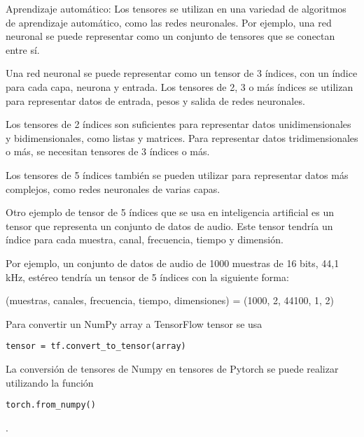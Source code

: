\documentclass[10pd,hyperref={colorlinks=true}]{beamer}
\begin{document}

\begin{frame}{}

 \vfill

Aprendizaje automático: Los tensores se utilizan en una 
variedad de algoritmos de aprendizaje automático, como las 
redes neuronales. Por ejemplo, una red neuronal se puede 
representar como un conjunto de tensores que se conectan entre 
sí.

Una red neuronal se puede representar como un tensor de 3 índices, 
con un índice para cada capa, neurona y entrada. Los tensores de 
2, 3 o más índices se utilizan para representar datos de entrada, 
pesos y salida de redes neuronales.

Los tensores de 2 índices son suficientes para representar datos 
unidimensionales y bidimensionales, como listas y matrices. Para 
representar datos tridimensionales o más, se necesitan tensores de 
3 índices o más.

Los tensores de 5 índices también se pueden utilizar para 
representar datos más complejos, como redes neuronales de varias 
capas. 

 \vfill

 \end{frame}


\begin{frame}{}

 \vfill

Otro ejemplo de tensor de 5 índices que se usa en inteligencia 
artificial es un tensor que representa un conjunto de datos de 
audio. Este tensor tendría un índice para cada muestra, canal, 
frecuencia, tiempo y dimensión.

Por ejemplo, un conjunto de datos de audio de 1000 muestras de 16 
bits, 44,1 kHz, estéreo tendría un tensor de 5 índices con la 
siguiente forma:

(muestras, canales, frecuencia, tiempo, dimensiones) = (1000, 2, 
44100, 1, 2)

 \vfill

 \end{frame}


\begin{frame}{}

 \vfill

Para convertir un NumPy array a TensorFlow tensor se usa

\centerline{\tt tensor = tf.convert\_to\_tensor(array)}

La conversión de tensores de Numpy en tensores de Pytorch se puede 
realizar utilizando la función

\centerline{\tt torch.from\_numpy()}.

 \vfill

 \end{frame}
\end{document}
